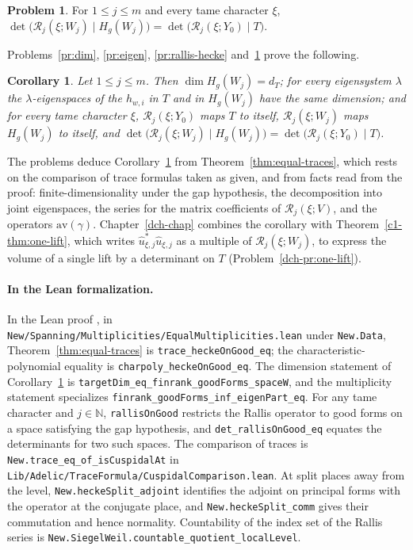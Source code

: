 \documentclass[reqno]{amsart}
\newcounter{chap}
\theoremstyle{plain}
\newtheorem{corollary}[theorem]{Corollary}
\theoremstyle{definition}
\newtheorem{problem}{Problem}[section]
\newcommand{\Rc}{\mathcal{R}}
\newcommand{\tl}[1]{\texttt{#1}}
\begin{document}
\begin{problem}\label{pr:det}
For \(1 \le j \le m\) and every tame character \(\xi\), \(\det\bigl(\Rc_j(\xi; W_j) \mid H_g(W_j)\bigr) = \det\bigl(\Rc_j(\xi; Y_0) \mid T\bigr)\).
\end{problem}

Problems~\ref{pr:dim}, \ref{pr:eigen}, \ref{pr:rallis-hecke} and~\ref{pr:det} prove the following.

\begin{corollary}\label{cor:equal}
Let \(1 \le j \le m\).  Then \(\dim H_g(W_j) = d_T\); for every eigensystem \(\lambda\) the \(\lambda\)-eigenspaces of the \(h_{w,i}\) in \(T\) and in \(H_g(W_j)\) have the same dimension; and for every tame character \(\xi\), \(\Rc_j(\xi; Y_0)\) maps \(T\) to itself, \(\Rc_j(\xi; W_j)\) maps \(H_g(W_j)\) to itself, and \(\det\bigl(\Rc_j(\xi; W_j) \mid H_g(W_j)\bigr) = \det\bigl(\Rc_j(\xi; Y_0) \mid T\bigr)\).
\end{corollary}

The problems deduce Corollary~\ref{cor:equal} from Theorem~\ref{thm:equal-traces}, which rests on the comparison of trace formulas taken as given, and from facts read from the proof: finite-dimensionality under the gap hypothesis, the decomposition into joint eigenspaces, the series for the matrix coefficients of \(\Rc_j(\xi; V)\), and the operators \(\mathrm{av}(\gamma)\).  Chapter~\ref{dch-chap} combines the corollary with Theorem~\ref{c1-thm:one-lift}, which writes \(\hat u_{\xi,j}^*\hat u_{\xi,j}\) as a multiple of \(\Rc_j(\xi; W_j)\), to express the volume of a single lift by a determinant on \(T\) (Problem~\ref{dch-pr:one-lift}).

\paragraph{In the Lean formalization.}
\begin{sloppypar}
In the Lean proof \cite{GL}, in \tl{New/Spanning/Multiplicities/EqualMultiplicities.lean} under \tl{New.Data}, Theorem~\ref{thm:equal-traces} is \tl{trace\_heckeOnGood\_eq}; the characteristic-polynomial equality is \tl{charpoly\_heckeOnGood\_eq}.  The dimension statement of Corollary~\ref{cor:equal} is \tl{targetDim\_eq\_finrank\_goodForms\_spaceW}, and the multiplicity statement specializes \tl{finrank\_goodForms\_inf\_eigenPart\_eq}.  For any tame character and \(j \in \mathbb N\), \tl{rallisOnGood} restricts the Rallis operator to good forms on a space satisfying the gap hypothesis, and \tl{det\_rallisOnGood\_eq} equates the determinants for two such spaces.
The comparison of traces is \tl{New.trace\_eq\_of\_isCuspidalAt} in \tl{Lib/Adelic/TraceFormula/CuspidalComparison.lean}.  At split places away from the level, \tl{New.heckeSplit\_adjoint} identifies the adjoint on principal forms with the operator at the conjugate place, and \tl{New.heckeSplit\_comm} gives their commutation and hence normality.  Countability of the index set of the Rallis series is \tl{New.SiegelWeil.countable\_quotient\_localLevel}.
\end{sloppypar}
\end{document}
